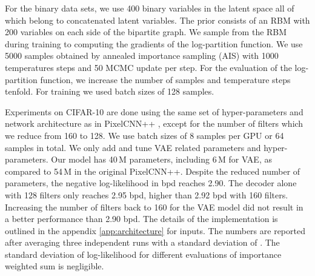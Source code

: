 \documentclass{article}
\begin{document}
For the binary data sets, we use 400 binary variables in the latent space  all of which belong to concatenated latent variables. The prior consists of an RBM with 200 variables on each side of the bipartite graph. We sample from the RBM during training to computing the gradients of the log-partition function. We use 5000 samples obtained by annealed importance sampling (AIS) \cite{neal2001annealed} with 1000 temperatures steps and 50 MCMC update per step. For the evaluation of the log-partition function, we increase the number of samples and temperature steps tenfold. For training we used batch sizes of 128 samples.

Experiments on CIFAR-10 are done using the same set of hyper-parameters and network architecture as in PixelCNN++ \cite{salimans2017pixelcnn++}, except for the number of filters which we reduce from 160 to 128. We use batch sizes of 8 samples per GPU or 64 samples in total. We only add and tune VAE related parameters and hyper-parameters. Our model has 40\,M parameters, including  6\,M for VAE,  as compared to 54\,M in the original PixelCNN++. Despite the reduced number of parameters, the negative log-likelihood in bpd reaches 2.90. The decoder alone with 128 filters only reaches 2.95 bpd, higher than 2.92 bpd with 160 filters. Increasing the number of filters back to 160 for the VAE model did not result in a better performance than 2.90 bpd. The details of the implementation is outlined in the appendix \ref{app:architecture} for  inputs. The numbers are reported after averaging three independent runs with a standard deviation of . The standard deviation of log-likelihood for different evaluations of importance weighted sum is negligible.
\end{document}
